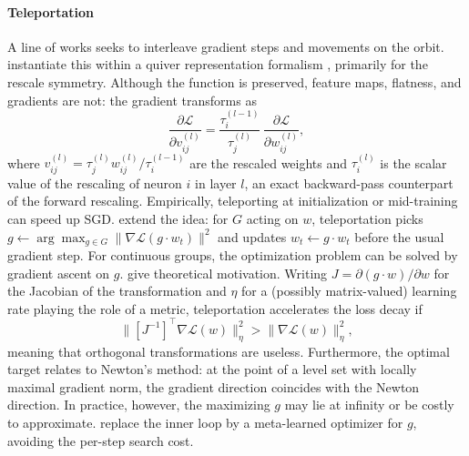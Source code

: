 \documentclass[mathematics,review,submit,moreauthors]{Definitions/mdpi}
\begin{document}
\paragraph{Teleportation}
A line of works seeks to interleave gradient steps and movements on the orbit.
\citet{armenta2021b} instantiate this within a quiver representation formalism \citep{armenta2021a}, primarily for the rescale symmetry.
Although the function is preserved, feature maps, flatness, and gradients are not: the gradient transforms as
\begin{equation*}
    \frac{\partial \mathcal{L}}{\partial v^{(l)}_{ij}}=\frac{\tau^{(l-1)}_i}{\tau^{(l)}_j}\,\frac{\partial \mathcal{L}}{\partial w^{(l)}_{ij}},
\end{equation*}
where $v^{(l)}_{ij}=\tau^{(l)}_jw^{(l)}_{ij}/\tau^{(l-1)}_i$ are the rescaled weights and $\tau^{(l)}_i$ is the scalar value of the rescaling of neuron $i$ in layer $l$, an exact backward-pass counterpart of the forward rescaling.
Empirically, teleporting at initialization or mid-training can speed up SGD.
\citet{zhao2023} extend the idea: for $G$ acting on $w$, teleportation picks $g\leftarrow\arg\max_{g\in G}\lVert\nabla\mathcal{L}(g\cdot w_t)\rVert^2$ and updates $w_t\leftarrow g\cdot w_t$ before the usual gradient step.
For continuous groups, the optimization problem can be solved by gradient ascent on $g$.
\citet{zhao2023} give theoretical motivation.
Writing $J=\partial(g\cdot w)/\partial w$ for the Jacobian of the transformation and $\eta$ for a (possibly matrix-valued) learning rate playing the role of a metric, teleportation accelerates the loss decay if
\begin{equation*}
    \big\lVert[J^{-1}]^{\top}\nabla\mathcal{L}(w)\big\rVert_{\eta}^2>\big\lVert\nabla\mathcal{L}(w)\big\rVert_{\eta}^2,
\end{equation*}
meaning that orthogonal transformations are useless.
Furthermore, the optimal target relates to Newton's method: at the point of a level set with locally maximal gradient norm, the gradient direction coincides with the Newton direction.
In practice, however, the maximizing $g$ may lie at infinity or be costly to approximate.
\citet{zhao2024} replace the inner loop by a meta-learned optimizer for $g$, avoiding the per-step search cost.
\end{document}

